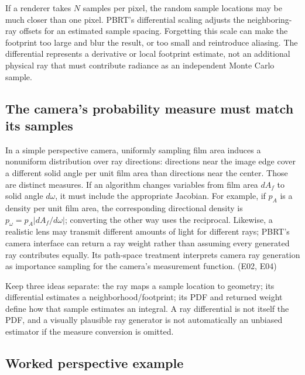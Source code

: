\hypertarget{02-foundations-ii-ch036-sample-spacing-is-part-of-the-derivative}{}

If a renderer takes \(N\) samples per pixel, the random sample locations may be much closer than one pixel. PBRT's differential scaling adjusts the neighboring-ray offsets for an estimated sample spacing. Forgetting this scale can make the footprint too large and blur the result, or too small and reintroduce aliasing. The differential represents a derivative or local footprint estimate, not an additional physical ray that must contribute radiance as an independent Monte Carlo sample.

\subsection{The camera's probability measure must match its samples}\label{02-foundations-ii-ch036-the-cameras-probability-measure-must-match-its-samples}

\hypertarget{02-foundations-ii-ch036-the-cameras-probability-measure-must-match-its-samples}{}

In a simple perspective camera, uniformly sampling film area induces a nonuniform distribution over ray directions: directions near the image edge cover a different solid angle per unit film area than directions near the center. Those are distinct measures. If an algorithm changes variables from film area \(dA_f\) to solid angle \(d\omega\), it must include the appropriate Jacobian. For example, if \(p_A\) is a density per unit film area, the corresponding directional density is \(p_\omega=p_A\left|dA_f/d\omega\right|\); converting the other way uses the reciprocal. Likewise, a realistic lens may transmit different amounts of light for different rays; PBRT's camera interface can return a ray weight rather than assuming every generated ray contributes equally. Its path-space treatment interprets camera ray generation as importance sampling for the camera's measurement function. (E02, E04)

Keep three ideas separate: the ray maps a sample location to geometry; its differential estimates a neighborhood/footprint; its PDF and returned weight define how that sample estimates an integral. A ray differential is not itself the PDF, and a visually plausible ray generator is not automatically an unbiased estimator if the measure conversion is omitted.

\subsection{Worked perspective example}\label{02-foundations-ii-ch036-worked-perspective-example}

